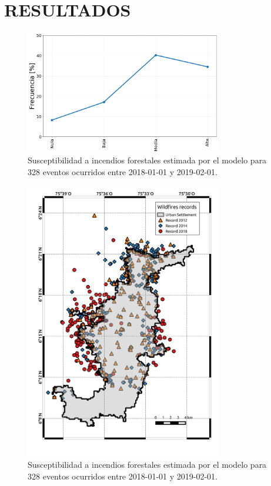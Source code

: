 \section{RESULTADOS}

\begin{figure}[h]
\centering
\includegraphics[trim={0.2cm 0cm 0.2cm 0cm},clip,width=8.6cm]{Figuras/susc_events.png}
\caption{Susceptibilidad a incendios forestales estimada por el modelo para 328 eventos ocurridos entre 2018-01-01 y 2019-02-01.}
\label{fig:temp_IPCC}
\end{figure}

\begin{figure}[h]
\centering
\includegraphics[trim={0.2cm 0cm 0.2cm 0cm},clip,width=8.6cm]{Figuras/map_wildfires.pdf}
\caption{Susceptibilidad a incendios forestales estimada por el modelo para 328 eventos ocurridos entre 2018-01-01 y 2019-02-01.}
\label{fig:map_wildfire}
\end{figure}
